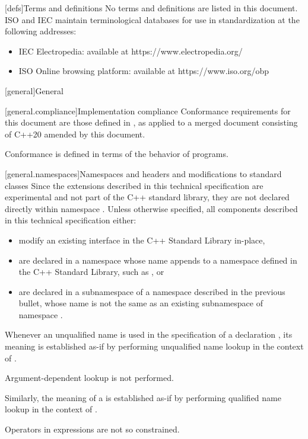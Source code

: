 [defs]{Terms and definitions}
\pnum
{}%
No terms and definitions are listed in this document. ISO and IEC maintain
terminological databases for use in standardization at the following addresses:

\begin{itemize}
    \item IEC Electropedia: available at https://www.electropedia.org/
    \item ISO Online browsing platform: available at https://www.iso.org/obp
\end{itemize}

[general]{General}

[general.compliance]{Implementation compliance}
\pnum
Conformance requirements for this document are those defined in , as applied to a merged document consisting of C++20 amended by this document.
\begin{note}
Conformance is defined in terms of the behavior of programs.
\end{note}

[general.namespaces]{Namespaces and headers and modifications to standard classes}
\pnum
Since the extensions described in this technical specification are experimental and not part of the C++ standard library, they are not declared directly within namespace . Unless otherwise specified, all components described in this technical specification either:

\begin{itemize}
    \item modify an existing interface in the C++ Standard Library in-place,
    \item are declared in a namespace whose name appends  to a namespace defined in the C++ Standard Library, such as , or
    \item are declared in a subnamespace of a namespace described in the previous bullet, whose name is not the same as an existing subnamespace of namespace .
\end{itemize}

\pnum
Whenever an unqualified name is used
in the specification of a declaration ,
its meaning is established
as-if by performing unqualified name lookup
in the context of .
\begin{note}
Argument-dependent lookup is not performed.
\end{note}
Similarly, the meaning of a  is established
as-if by performing qualified name lookup
in the context of .
\begin{note}
Operators in expressions are not so constrained.
\end{note}

